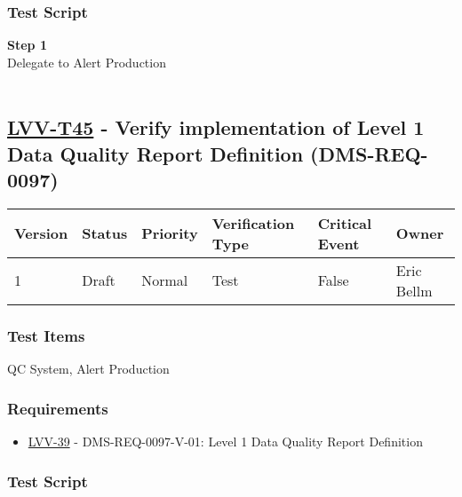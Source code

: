 \hypertarget{test-script-21}{%
\subsubsection{Test Script}\label{test-script-21}}

\textbf{Step 1}\\
Delegate to Alert Production\\
~\\

\hypertarget{lvv-t45---verify-implementation-of-level-1-data-quality-report-definition-dms-req-0097}{%
\subsection{\texorpdfstring{\href{https://jira.lsstcorp.org/secure/Tests.jspa\#/testCase/LVV-T45}{LVV-T45}
- Verify implementation of Level 1 Data Quality Report Definition
(DMS-REQ-0097)}{LVV-T45 - Verify implementation of Level 1 Data Quality Report Definition (DMS-REQ-0097)}}\label{lvv-t45---verify-implementation-of-level-1-data-quality-report-definition-dms-req-0097}}

\begin{longtable}[]{@{}llllll@{}}
\toprule
Version & Status & Priority & Verification Type & Critical Event &
Owner\tabularnewline
\midrule
\endhead
1 & Draft & Normal & Test & False & Eric Bellm\tabularnewline
\bottomrule
\end{longtable}

\hypertarget{test-items-21}{%
\subsubsection{Test Items}\label{test-items-21}}

QC System, Alert Production

\hypertarget{requirements-22}{%
\subsubsection{Requirements}\label{requirements-22}}

\begin{itemize}
\tightlist
\item
  \href{https://jira.lsstcorp.org/browse/LVV-39}{LVV-39} -
  DMS-REQ-0097-V-01: Level 1 Data Quality Report Definition
\end{itemize}

\hypertarget{test-script-22}{%
\subsubsection{Test Script}\label{test-script-22}}

